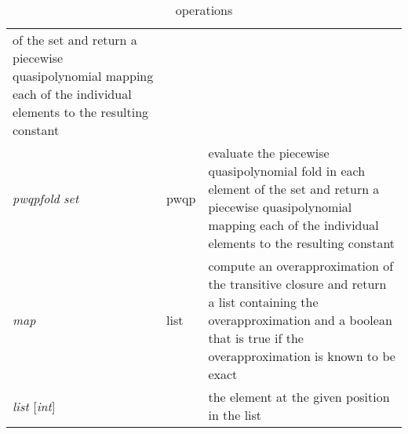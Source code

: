 \begin{table}
\begin{tabular}{llp{}}
of the set and return a piecewise quasipolynomial
mapping each of the individual elements to the resulting
constant
\\
{\it pwqpfold} \ai{@} {\it set} & pwqp &
evaluate the piecewise quasipolynomial fold in each element
of the set and return a piecewise quasipolynomial
mapping each of the individual elements to the resulting
constant
\\
{\it map} \ai[\tt]{\^{}+} & list &
compute an overapproximation of the transitive closure
and return a list containing the overapproximation
and a boolean that is true if the overapproximation
is known to be exact
\\
{\it list} [{\it int}] & &
the element at the given position in the list
\\
\end{tabular}
\caption{\protect{} operations}
\label{t:iscc}
\end{table}

